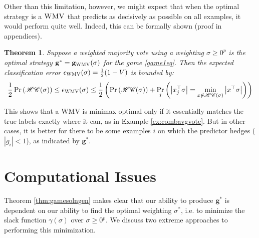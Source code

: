 \documentclass{colt2015} %
\newtheorem{thm}{Theorem}%
\newcommand{\vg}{\mathbf{g}}
\DeclareMathOperator{\Prtxt}{Pr}
\newcommand{\abs}[1]{\left| #1 \right|}
\newcommand{\prp}[2]{\Prtxt_{#2} \left(#1\right)}
\newcommand{\wmv}{\textsc{WMV}}
\newcommand{\hc}{\mathscr{HC}}
\newcommand{\lrp}[1]{\left(#1\right)}
\newcommand{\authcmt}[2]{\textcolor{#1}{}}
\newcommand{\akshay}[1]{\authcmt{red}{[AB: #1]}}
\begin{document}
Other than this limitation, however, we might expect that when the optimal strategy is a $\wmv$ 
that predicts as decisively as possible on all examples, it would perform quite well. 
Indeed, this can be formally shown (proof in appendices).
\begin{thm}
\label{thm:wmvoptcond}
Suppose a weighted majority vote using a weighting $\sigma \geq 0^p$ 
is the optimal strategy $\vg^* = \vg_{\wmv} (\sigma)$ for the game \eqref{game1eq}.
Then the expected classification error $\epsilon_{\wmv} (\sigma) = \frac{1}{2} (1-V)$ is bounded by: 
\begin{align*}
\frac{1}{2} \prp{\hc (\sigma)}{} 
\leq \epsilon_{\wmv} (\sigma)
\leq \frac{1}{2} \lrp{ \prp{\hc (\sigma)}{} + \prp{ \abs{x_j^\top \sigma} = \min_{x \notin \hc(\sigma)} \abs{x^\top \sigma} }{j}}
\end{align*}
\end{thm}


This shows that a WMV is minimax optimal only if it essentially matches the true labels exactly where it can, 
as in Example \ref{ex:combavgvote}. 
But in other cases, it is better for there to be some examples $i$ on which 
the predictor hedges ($\abs{g_i} < 1$), as indicated by $\vg^*$. 

\akshay{I can't prove an analogous result to Thm. \ref{thm:zbrunconstr}, 
But I think we need an example here where it is better to hedge at all. \\ \\
On another note, I have an error bound on an arbitrary WMV as well in terms of its margins - 
but that might exceed our scope here.}

\fi







\section{Computational Issues}
\label{sec:alg}
Theorem \ref{thm:gamesolngen} makes clear that our ability to produce $\vg^*$ 
is dependent on our ability to find the optimal weighting $\sigma^*$, 
i.e. to minimize the slack function $\gamma (\sigma)$ over $\sigma \geq 0^p$. 
We discuss two extreme approaches to performing this minimization.
\end{document}
